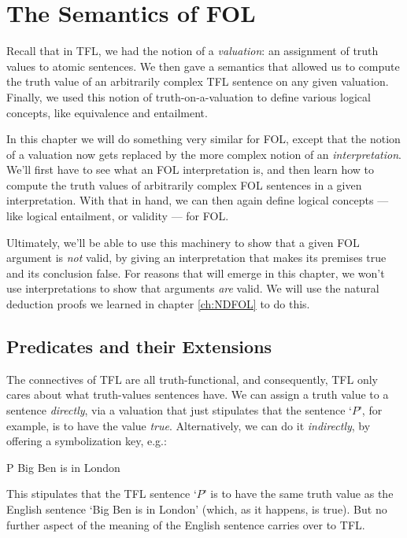 \chapter{The Semantics of FOL}\label{ch:FOLSemantics}

Recall that in TFL, we had the notion of a \emph{valuation}: an assignment of truth values to atomic sentences.  We then gave a semantics that allowed us to compute the truth value of an arbitrarily complex TFL sentence on any given valuation.  Finally, we used this notion of truth-on-a-valuation to define various logical concepts, like equivalence and entailment.

In this chapter we will do something very similar for FOL, except that the notion of a valuation now gets replaced by the more complex notion of an \emph{interpretation}.  We'll first have to see what an FOL interpretation is, and then learn how to compute the truth values of arbitrarily complex FOL sentences in a given interpretation.  With that in hand, we can then again define logical concepts --- like logical entailment, or validity --- for FOL.

Ultimately, we'll be able to use this machinery to show that a given FOL argument is \emph{not} valid, by giving an interpretation that makes its premises true and its conclusion false.  For reasons that will emerge in this chapter, we won't use interpretations to show that arguments \emph{are} valid.  We will use the natural deduction proofs we learned in chapter \ref{ch:NDFOL} to do this.


\section{Predicates and their Extensions}

The connectives of TFL are all truth-functional, and consequently, TFL only cares about what truth-values sentences have. We can assign a truth value to a sentence \emph{directly}, via a valuation that just stipulates that the sentence `$P$', for example, is to have the value \emph{true}. Alternatively, we can do it \emph{indirectly}, by offering a symbolization key, e.g.:
	\begin{ekey}
		\item[P] Big Ben is in London
	\end{ekey}
This stipulates that the TFL sentence `$P$' is to have the same truth value as the English sentence `Big Ben is in London' (which, as it happens, is true).  But no further aspect of the meaning of the English sentence carries over to TFL.


